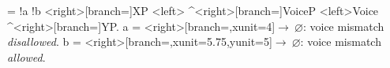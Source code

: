 \begin{exe}
\ex
\jtree[scaleby=1.5]
\! = {} !a !b
    <right>[branch=\etcbranch]{XP}
    <left>{} ^<right>[branch=\etcbranch]{VoiceP}
    <left>{Voice} ^<right>[branch=\etcbranch]{YP}.
\!a = <right>[branch=\blank,xunit=4]{$\rightarrow ~\varnothing$: voice mismatch \textit{disallowed}}.
\!b = <right>[branch=\blank,xunit=5.75,yunit=5]{$\rightarrow ~\varnothing$: voice mismatch \textit{allowed}}.
\endjtree
{}
\end{exe}
